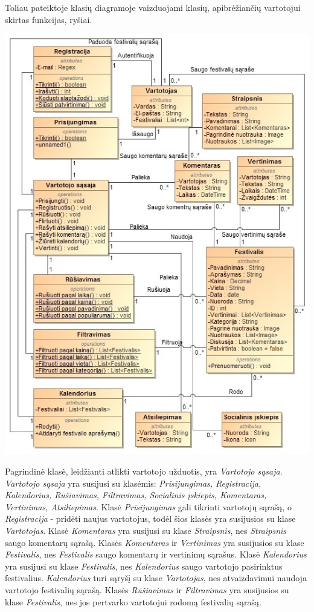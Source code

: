 ﻿\documentclass{VUMIFPSkursinis}
\begin{document}
Toliau pateiktoje klasių diagramoje vaizduojami klasių, apibrėžiančių vartotojui skirtas funkcijas, ryšiai.
\begin{center}
    \includegraphics[scale=0.5]{img/PSI3/user}
\end{center}
Pagrindinė klasė, leidžianti atlikti vartotojo užduotis, yra \textit{Vartotojo sąsaja}. \textit{Vartotojo sąsaja} yra susijusi su klasėmis: \textit{Prisijungimas, Registracija, Kalendorius, Rūšiavimas, Filtravimas, Socialinis įskiepis, Komentaras, Vertinimas, Atsiliepimas}. Klasė \textit{Prisijungimas} gali tikrinti vartotojų sąrašą, o \textit{Registracija} - pridėti naujus vartotojus, todėl šios klasės yra susijusios su klase \textit{Vartotojas}. Klasė \textit{Komentaras} yra susijusi su klase \textit{Straipsnis}, nes \textit{Straipsnis} saugo komentarų sąrašą. Klasės \textit{Komentaras} ir \textit{Vertinimas} yra susijusios su klase \textit{Festivalis}, nes \textit{Festivalis} saugo komentarų ir vertinimų sąrašus. Klasė \textit{Kalendorius} yra susijusi su klase \textit{Festivalis}, nes \textit{Kalendorius} saugo vartotojo pasirinktus festivalius. \textit{Kalendorius} turi sąryšį su klase \textit{Vartotojas}, nes atvaizdavimui naudoja vartotojo festivalių sąrašą. Klasės \textit{Rūšiavimas} ir \textit{Filtravimas} yra susijusios su klase \textit{Festivalis}, nes jos pertvarko vartotojui rodomą festivalių sąrašą.
\end{document}
